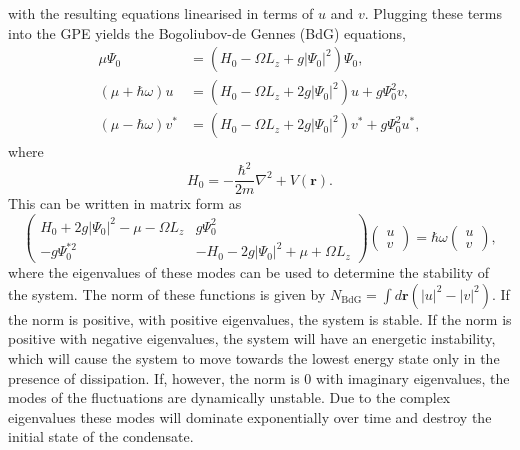 with the resulting equations linearised in terms of $u$ and $v$. Plugging these terms into the GPE yields the Bogoliubov-de Gennes (BdG) equations,
\begin{subequations}\label{eqn:bogo_lhsrhs}
\begin{align}
    \mu \Psi_0 &= (H_0 - \Omega L_z + g |\Psi_0|^2)\Psi_0,\\
    (\mu +\hbar\omega)u &= (H_0 - \Omega L_z + 2g|\Psi_0|^2)u + g\Psi_0^2 v,\\
    (\mu -\hbar\omega)v^{*} &= (H_0 - \Omega L_z + 2g|\Psi_0|^2)v^{*} + g\Psi_0^2 u^{*},
\end{align}
\end{subequations}
where
\begin{equation}\label{eqn:bogo_h0}
H_0 = -\frac{\hbar^2}{2m}\nabla^2 + V(\mathbf{r}).
\end{equation}
This can be written in matrix form as
\begin{equation}
    \begin{pmatrix}
        H_0 + 2g|\Psi_0|^2- \mu -\Omega L_z & g\Psi_0^2 \\
        -g\Psi_0^{*2} & -H_0 - 2g|\Psi_0|^2 + \mu +\Omega L_z
    \end{pmatrix}
    \begin{pmatrix}
        u \\
        v
    \end{pmatrix}
    = \hbar\omega
    \begin{pmatrix}
        u \\
        v
    \end{pmatrix},
\end{equation}
where the eigenvalues of these modes can be used to determine the stability of the system. The norm of these functions is given by $N_{\textrm{BdG}}=\int d\mathbf{r}(|u|^2 - |v|^2)$. If the norm is positive, with positive eigenvalues, the system is stable. If the norm is positive with negative eigenvalues, the system will have an energetic instability, which will cause the system to move towards the lowest energy state only in the presence of dissipation. If, however, the norm is 0 with imaginary eigenvalues, the modes of the fluctuations are dynamically unstable. Due to the complex eigenvalues these modes will dominate exponentially over time and destroy the initial state of the condensate. %

